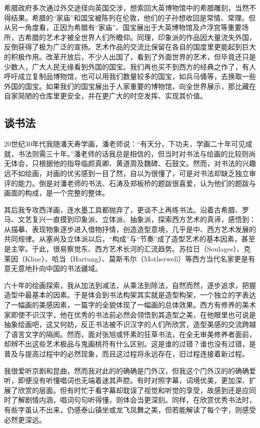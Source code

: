 \documentclass{article}
\begin{document}
希腊政府多次通过外交途径向英国交涉，想索回大英博物馆中的希腊雕刻，当然不得结果。希腊的“家庙”和国宝被陈列在伦敦，他们的子孙想收回是常情、常理。但从另一角度看，正因为希腊有“家庙”、国宝展出于大英博物馆及卢浮宫等重要场所，古希腊的艺术才被全世界人们所瞻仰。同理，印象派的作品因大量流失外国，反倒获得了极为广泛的宣扬。艺术作品的交流比保留在各自的国度里更能起到巨大的积极作用。改革开放后，不少人出国了，看到了外面世界的艺术，但毕竟还只是少数人，广大人民无缘看到外国的国宝。我们再也买不到西方的经典之作了，有人呼吁成立复制品博物馆，也可以用我们数量较多的国宝，如兵马俑等，去换取一些外国的国宝。如果我们的国宝展出于人家重要的博物馆，向全世界展示，那比藏在自家简陋的仓库里更安全，并在更广大的时空发挥、实现其价值。
\subsection{谈书法}
20世纪30年代我随潘天寿学画，潘老师说：“有天分，下功夫，学画二十年可见成就，书法则需三十年。”潘老师的话我总是相信的，但当时对书法与绘画的比较则尚无体会，只根据他的指导临颜真卿、黄道周及魏碑、石鼓文。然而，对书法的兴趣远不如绘画，对画的优劣感到一目了然，自以为很懂了，可是对书法却缺乏独立审评的能力。倒是对潘老师的书法、石涛及郑板桥的题跋很喜爱，认为他们的题跋与画面的构成，是一个完整的整体。

其后我专攻西洋画，连水墨工具都抛弃了，更谈不上再练书法。沿着古希腊、罗马、文艺复兴一直摸到印象派、立体派、抽象派，探索西方艺术的真谛，感悟到：从描摹、表现物象逐步进入借物抒情，创造造型意境，几乎是中、西方艺术发展的共同规律。从塞尚及立体派以后，“构成”与“节奏”成了造型艺术的基本因素，甚至是主宰。于此，很易察觉东、西方艺术长河的汇流趋势。苏拉日（Soulages）、克莱因（Kline）、哈当（Hartung）、莫斯韦尔（Motherwell）等西方当代名家更是有意无意地扑向中国的书法疆域。

六十年的绘画探索，我从加法到减法，从乘法到除法，自然而然，逐步追求，把握造型中最基本的因素。于是体会到书法构架其实就是造型构架，一个独立的字表达了一幅画的美感因素，一篇字的全貌体现了一幅画的总体效果。西方有修养的美术家即使不识汉字，他在优秀的书法前必然会领悟到其造型之美，在他眼里也可说是抽象绘画吧，这又何妨，反正书法被不识汉字的人们所欣赏，造型美感的交流跨越了语言文字的隔阂。然而，面对张旭或怀素的狂草书法，在全无审美修养者面前，却辨不出这些艺术极品与鬼画桃符有什么区别。这是谁的过错？谁也没有过错，是普及与提高过程中的必然现象，而且这过程将永远存在，旧过程连接着新过程。

我很爱听京剧和昆曲，然而我对此的的确确是门外汉，但我这个门外汉的的确确爱听，即便没有听懂唱词也无端着迷其声腔。有时对照字幕，词境优美，更加深、扩展了欣赏的层面。但有时忙于看字幕却耽误了视觉和听觉的享受，故感到还是应同时了解剧情内涵，唱词句句听得懂，则体会当更深刻。同样，在欣赏优秀书法时，有些字虽认不出来，仍感泰山镇坐或龙飞凤舞之美，但若能解读了每个字，则感受必然更深远。
\end{document}
